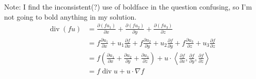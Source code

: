 \documentclass{article}
\begin{document}
Note: I find the inconsistent(?) use of boldface in the question
confusing, so I'm not going to bold anything in my solution.
%
\begin{align*}
    \operatorname{div}(f u)
        &= \frac{\partial (f u_1)}{\partial x}
           + \frac{\partial (f u_2)}{\partial y}
           + \frac{\partial (f u_3)}{\partial z}
           \\
        &= f \frac{\partial u_1}{\partial x} + u_1 \frac{\partial f}{\partial x}
           + f \frac{\partial u_2}{\partial y} + u_2 \frac{\partial f}{\partial y}
           + f \frac{\partial u_3}{\partial z} + u_3 \frac{\partial f}{\partial z}
           \\
        &= f \left(
            \frac{\partial u_1}{\partial x}
            + \frac{\partial u_2}{\partial y}
            + \frac{\partial u_3}{\partial z}
           \right) +
           u \cdot \left\langle
                \frac{\partial f}{\partial x},
                \frac{\partial f}{\partial y},
                \frac{\partial f}{\partial z}
           \right\rangle \\
        &= f \operatorname{div} u + u \cdot \nabla f
\end{align*}
\end{document}
